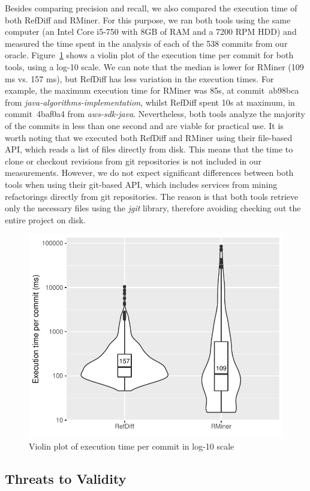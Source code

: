 Besides comparing precision and recall, we also compared the execution time of both RefDiff and RMiner.
For this purpose, we ran both tools using the same computer (an Intel Core i5-750 with 8GB of RAM and a 7200 RPM HDD) and measured the time spent in the analysis of each of the 538 commits from our oracle.
Figure~\ref{FigVioplotExecTime} shows a violin plot of the execution time per commit for both tools, using a log-10 scale.
We can note that the median is lower for RMiner (109 ms vs. 157 ms), but RefDiff has less variation in the execution times. For example, the maximum execution time for RMiner was 85s, at commit~ab98bca from  \textit{java-algorithms-implementation}, whilst RefDiff spent 10s at maximum, in commit~4baf0a4 from \textit{aws-sdk-java}.
Nevertheless, both tools analyze the majority of the commits in less than one second and are viable for practical use.
It is worth noting that we executed both RefDiff and RMiner using their file-based API, which  reads a list of files directly from disk.
This means that the time to clone or checkout revisions from git repositories is not included in our measurements.
However, we do not expect significant differences between both tools when using their git-based API, which includes services from mining refactorings directly from git repositories. The reason is that both tools retrieve only the necessary files using the \textit{jgit} library, therefore avoiding checking out the entire project on disk.

\begin{figure}[htbp]
\centering
\includegraphics[width=0.7\linewidth]{img/vioplot-exec-time.pdf}
\caption{Violin plot of execution time per commit in log-10 scale}
\label{FigVioplotExecTime}
\end{figure}

\subsection{Threats to Validity}
\label{SecThreatsJava}

